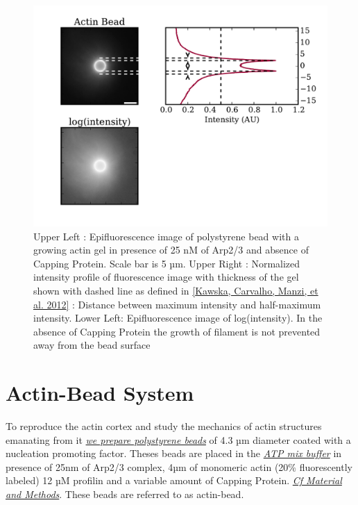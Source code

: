 \documentclass[A4paperpaper,11pt,english]{sphinxmanual}
\begin{document}
\begin{figure}[htbp]
\centering
\capstart

\includegraphics[width=1.000\linewidth]{intensity_profile_25nM_Arp_0nM_CP_30min.pdf}
\caption{Upper Left : Epifluorescence image of polystyrene bead with a growing actin
gel in presence of 25 nM of Arp2/3 and absence of Capping Protein. Scale bar
is 5 µm.  Upper Right : Normalized intensity profile of fluorescence image
with thickness of the gel shown with dashed line as defined in
{\hyperref[parts/part3:kawska2012]{{[}Kawska, Carvalho, Manzi,  et al.  2012{]}}} : Distance between maximum intensity and half-maximum
intensity.  Lower Left: Epifluorescence image of log(intensity). In the
absence of Capping Protein the growth of filament is not prevented away
from the bead surface}\end{figure}


\section{Actin-Bead System}
\label{parts/part3:actin-bead-system}
To reproduce the actin cortex and study the mechanics of actin structures
emanating from it {\hyperref[parts/part2:bead-preparation]{\emph{we prepare polystyrene beads}}} of 4.3
µm diameter coated with a nucleation promoting factor. Theses beads are placed
in the {\hyperref[parts/part2:atp-mix-buffer]{\emph{ATP mix buffer}}} in presence of 25nm of Arp2/3
complex, 4µm of monomeric actin (20\% fluorescently labeled) 12 µM profilin and
a variable amount of Capping Protein. {\hyperref[parts/part2:m-et-m]{\emph{Cf Material and Methods}}}.
These beads are referred to as actin-bead.
\end{document}
